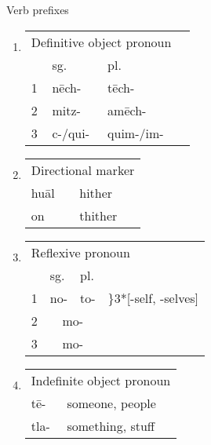 \documentclass[12pt]{beamer}
\newcommand{\nah}[1]{\textcolor{nahgrn}{#1}}
\newcommand{\trs}[1]{\textcolor{nahblu}{#1}}
\begin{document}
\begin{frame}
\begin{columns}[t]
\begin{column}{0.18\linewidth}
\begin{block}{Verb prefixes}
\begin{enumerate}
\begin{threeparttable}
          \end{threeparttable}
        \item 
          \begin{tabular}[t]{llll}
            \multicolumn{3}{l}{Definitive object pronoun}\\
            & sg. & pl. \\
            1 & \nah{nēch-} & \nah{tēch-} \\
            2 & \nah{mitz-} & \nah{amēch-}\\
            3 & \nah{c-/qui-} & \nah{quim-/im-} \\
          \end{tabular}
        \item
          \begin{tabular}[t]{ll}
            \multicolumn{2}{l}{Directional marker}\\
            \nah{huāl} & \trs{hither}\\
            \nah{on} & \trs{thither}\\
          \end{tabular}
        \item
          \begin{tabular}[t]{llll}
            \multicolumn{4}{l}{Reflexive pronoun}\\
            & sg. & pl. & \\
            1 & \nah{no-} & \nah{to-}& \trs{\hspace{-1em}\rdelim\}{3}{*}[-self, -selves]}\\
            2 & \multicolumn{2}{c}{\nah{mo-}}  \\
            3 & \multicolumn{2}{c}{\nah{mo-}}  \\
          \end{tabular}
        \item 
          \begin{tabular}[t]{ll}
            \multicolumn{2}{l}{Indefinite object pronoun}\\
            \nah{tē-} & \trs{someone, people}\\
            \nah{tla-} & \trs{something, stuff} \\
          \end{tabular}
        \end{enumerate}
      \end{block}


\end{column}
\end{columns}
\end{frame}
\end{document}
